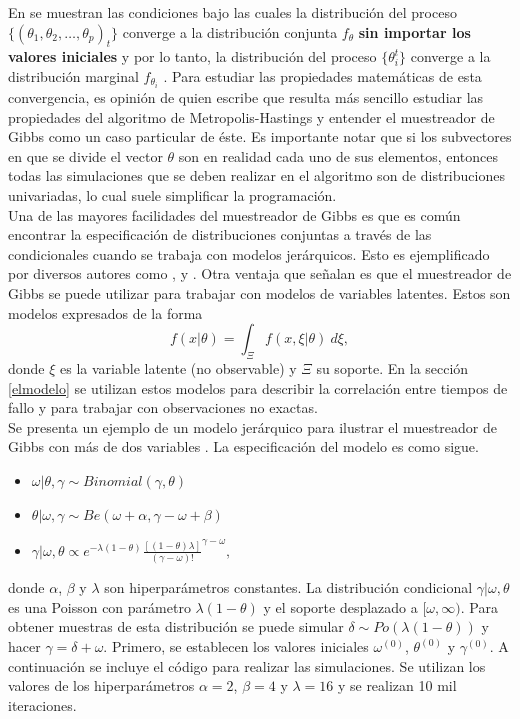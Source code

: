 \documentclass[11pt,a4paper]{article}
\begin{document}
En \citet{geman} se muestran las condiciones bajo las cuales la distribución del proceso $\lbrace (\theta_1, \theta_2, \dots, \theta_p)_t\rbrace$ converge a la distribución conjunta $f_{\theta}$ \textbf{sin importar los valores iniciales} y por lo tanto, la distribución del proceso $\lbrace \theta_i^t \rbrace$ converge a la distribución marginal $f_{\theta_i}$ \citep{gelfand_smith}. Para estudiar las propiedades matemáticas de esta convergencia, es opinión de quien escribe que resulta más sencillo estudiar las propiedades del algoritmo de Metropolis-Hastings y entender el muestreador de Gibbs como un caso particular de éste. Es importante notar que si los subvectores en que se divide el vector $\theta$ son en realidad cada uno de sus elementos, entonces todas las simulaciones que se deben realizar en el algoritmo son de distribuciones univariadas, lo cual suele simplificar la programación.\\

Una de las mayores facilidades del muestreador de Gibbs es que es común encontrar la especificación de distribuciones conjuntas a través de las condicionales cuando se trabaja con modelos jerárquicos. Esto es ejemplificado por diversos autores como \citet{casella}, \citet{gelman} y \citet{gelfand_smith}. Otra ventaja que señalan \citet{casella} es que el muestreador de Gibbs se puede utilizar para trabajar con modelos de variables latentes. Estos son modelos expresados de la forma $$f(x| \theta) = \int_\Xi f(x, \xi | \theta) \ d\xi,$$ donde $\xi$ es la variable latente (no observable) y $\Xi$ su soporte. En la sección \ref{elmodelo} se utilizan estos modelos para describir la correlación entre tiempos de fallo y para trabajar con observaciones no exactas.\\

Se presenta un ejemplo de un modelo jerárquico para ilustrar el muestreador de Gibbs con más de dos variables \citep{casella_gs}. La especificación del modelo es como sigue.
\begin{itemize}
\item $\omega|\theta, \gamma \sim Binomial(\gamma, \theta)$
\item $\theta | \omega, \gamma \sim Be(\omega + \alpha, \gamma - \omega + \beta)$
\item $\gamma | \omega, \theta \propto e^{-\lambda(1-\theta)}\frac{[(1-\theta)\lambda]}{(\gamma - \omega)!}^{\gamma - \omega},$
\end{itemize}
donde $\alpha$, $\beta$ y $\lambda$ son hiperparámetros constantes. La distribución condicional $\gamma | \omega, \theta$ es una Poisson con parámetro $\lambda(1-\theta)$ y el soporte desplazado a $[\omega, \infty)$. Para obtener muestras de esta distribución se puede simular $\delta \sim Po(\lambda(1-\theta))$ y hacer $\gamma = \delta + \omega$. Primero, se establecen los valores iniciales $\omega^{(0)}$, $\theta^{(0)}$ y $\gamma^{(0)}$. A continuación se incluye el código para realizar las simulaciones. Se utilizan los valores de los hiperparámetros $\alpha = 2$, $\beta = 4$ y $\lambda = 16$ y se realizan 10 mil iteraciones.\\
\newpage
\end{document}
